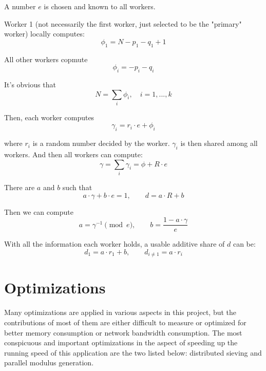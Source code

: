 A number $e$ is chosen and known to all workers.

Worker 1 (not necessarily the first worker, just selected to be the "primary" worker) locally computes:
\begin{equation}
  \phi_1 = N - p_1 - q_1 + 1
\end{equation}

All other workers copmute
\begin{equation}
  \phi_i = - p_i - q_i
\end{equation}

It's obvious that
\begin{equation}
  N = \sum_i \phi_i, \quad i = 1, ..., k
\end{equation}

Then, each worker computes
\begin{equation}
  \gamma_i = r_i \cdot e + \phi_i
\end{equation}

where $r_i$ is a random number decided by the worker. $\gamma_i$ is then shared among all workers. And then all workers can compute:
\begin{equation}
  \gamma = \sum_i \gamma_i = \phi + R \cdot e
\end{equation}

There are $a$ and $b$ such that
\begin{equation}
  a \cdot \gamma + b \cdot e = 1, \qquad
  d = a \cdot R + b
\end{equation}

Then we can compute
\begin{equation}
  a = \gamma^{-1} \pmod{ e}, \qquad b = \frac{1-a \cdot \gamma}{e}
\end{equation}

With all the information each worker holds, a usable additive share of $d$ can be:
\begin{equation}
  d_1 = a\cdot r_1 + b, \qquad d_{i \neq 1} = a \cdot r_i
\end{equation}

\section{Optimizations}

Many optimizations are applied in various aspects in this project, but the contributions of most of them are either difficult to measure or optimized for better memory consumption or network bandwidth consumption. The most conspicuous and important optimizations in the aspect of speeding up the running speed of this application are the two listed below: distributed sieving and parallel modulus generation.

